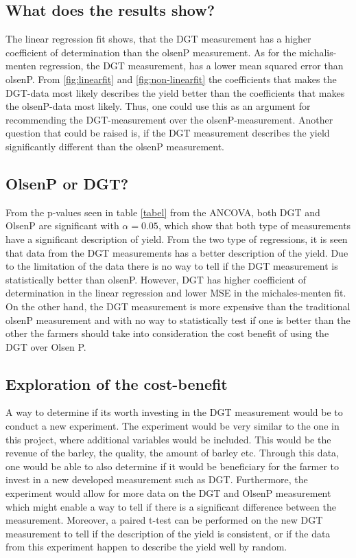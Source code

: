 \documentclass[11pt, fleqn, titlepage]{article}
\begin{document}
\subsection*{What does the results show?}
The linear regression fit shows, that the DGT measurement has a higher coefficient of determination than the olsenP measurement. As for the michalis-menten regression, the DGT measurement, has a lower mean squared error than olsenP. From \ref{fig:linearfit} and \ref{fig:non-linearfit} the coefficients that makes the DGT-data most likely describes the yield better than the coefficients that makes the olsenP-data most likely. Thus, one could use this as an argument for recommending the DGT-measurement over the olsenP-measurement. Another question that could be raised is, if the DGT measurement describes the yield significantly different than the olsenP measurement.

\subsection*{OlsenP or DGT?} 
From the p-values seen in table \ref{tabel} from the ANCOVA, both DGT and OlsenP are significant with $ \alpha = 0.05 $, which show that both type of measurements have a significant description of yield. From the two type of regressions, it is seen that data from the DGT measurements has a better description of the yield. Due to the limitation of the data there is no way to tell if the DGT measurement is statistically better than olsenP. However, DGT has higher coefficient of determination in the linear regression and lower MSE in the michales-menten fit. On the other hand, the DGT measurement is more expensive than the traditional olsenP measurement and with no way to statistically test if one is better than the other the farmers should take into consideration the cost benefit of using the DGT over Olsen P. 

\subsection*{Exploration of the cost-benefit }
A way to determine if its worth investing in the DGT measurement would be to conduct a new experiment. The experiment would be very similar to the one in this project, where additional variables would be included. This would be the revenue of the barley, the quality, the amount of barley etc. Through this data, one would be able to also determine if it would be beneficiary for the farmer to invest in a new developed measurement such as DGT. Furthermore, the experiment would allow for more data on the DGT and OlsenP measurement which might enable a way to tell if there is a significant difference between the measurement. Moreover, a paired t-test can be performed on the new DGT measurement to tell if the description of the yield is consistent, or if the data from this experiment happen to describe the yield well by random. 
\end{document}
